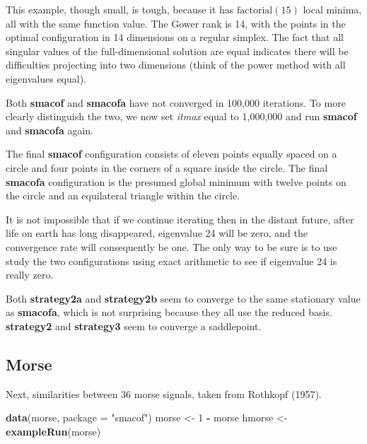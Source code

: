\documentclass[
  12pt,
]{article}
\newenvironment{Shaded}{\begin{snugshade}}{\end{snugshade}}
\newcommand{\AttributeTok}[1]{\textcolor[rgb]{0.13,0.29,0.53}{#1}}
\newcommand{\DecValTok}[1]{\textcolor[rgb]{0.00,0.00,0.81}{#1}}
\newcommand{\FunctionTok}[1]{\textcolor[rgb]{0.13,0.29,0.53}{\textbf{#1}}}
\newcommand{\NormalTok}[1]{#1}
\newcommand{\OtherTok}[1]{\textcolor[rgb]{0.56,0.35,0.01}{#1}}
\newcommand{\SpecialCharTok}[1]{\textcolor[rgb]{0.81,0.36,0.00}{\textbf{#1}}}
\newcommand{\StringTok}[1]{\textcolor[rgb]{0.31,0.60,0.02}{#1}}
\begin{document}
This example, though small, is tough, because it has \(\text{factorial}(15)\) local minima, all
with the same function value. The Gower rank is 14, with the points in the
optimal configuration in 14 dimensions on a regular simplex. The fact that
all singular values of the full-dimensional solution are equal indicates
there will be difficulties projecting into two dimensions (think of
the power method with all eigenvalues equal).

Both \textbf{smacof} and \textbf{smacofa} have not converged in 100,000 iterations.
To more clearly distinguish the two, we now set \emph{itmax} equal to 1,000,000 and
run \textbf{smacof} and \textbf{smacofa} again.

The final \textbf{smacof} configuration consists of eleven points equally spaced on a circle
and four points in the corners of a square inside the circle. The final \textbf{smacofa}
configuration is the presumed global minimum with twelve points on the circle and an equilateral triangle within the circle.

It is not impossible that if we continue iterating then
in the distant future, after life on earth has long disappeared,
eigenvalue 24 will be zero, and the convergence rate will consequently
be one. The only way to be sure is to use study the two configurations
using exact arithmetic to see if eigenvalue 24 is really zero.

Both \textbf{strategy2a} and \textbf{strategy2b} seem to converge to the same stationary value as
\textbf{smacofa}, which is not surprising because they all use the reduced basis.
\textbf{strategy2} and \textbf{strategy3} seem to converge a saddlepoint.

\subsection{Morse}\label{morse}

Next, similarities between 36 morse signals, taken from Rothkopf (1957).

\begin{Shaded}
\begin{Highlighting}[]
\FunctionTok{data}\NormalTok{(morse, }\AttributeTok{package =} \StringTok{"smacof"}\NormalTok{)}
\NormalTok{morse }\OtherTok{\textless{}{-}} \DecValTok{1} \SpecialCharTok{{-}}\NormalTok{ morse}
\NormalTok{hmorse }\OtherTok{\textless{}{-}} \FunctionTok{exampleRun}\NormalTok{(morse)}
\end{Highlighting}
\end{Shaded}
\end{document}
